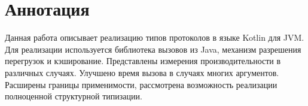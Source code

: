 \section*{Аннотация}
Данная работа описывает реализацию типов протоколов в языке Kotlin для JVM. Для реализации используется библиотека вызовов из Java, механизм разрешения перегрузок и кэширование. Представлены измерения производительности в различных случаях. Улучшено время вызова в случаях многих аргументов. Расширены границы применимости, рассмотрена возможность реализации полноценной структурной типизации. 
